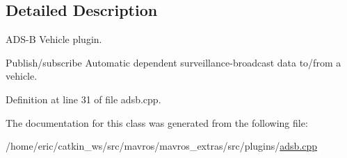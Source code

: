 \subsection{Detailed Description}
A\+D\+S-\/B Vehicle plugin. 

Publish/subscribe Automatic dependent surveillance-\/broadcast data to/from a vehicle. 

Definition at line 31 of file adsb.\+cpp.



The documentation for this class was generated from the following file\+:\begin{DoxyCompactItemize}
\item 
/home/eric/catkin\+\_\+ws/src/mavros/mavros\+\_\+extras/src/plugins/\mbox{\hyperlink{adsb_8cpp}{adsb.\+cpp}}\end{DoxyCompactItemize}
